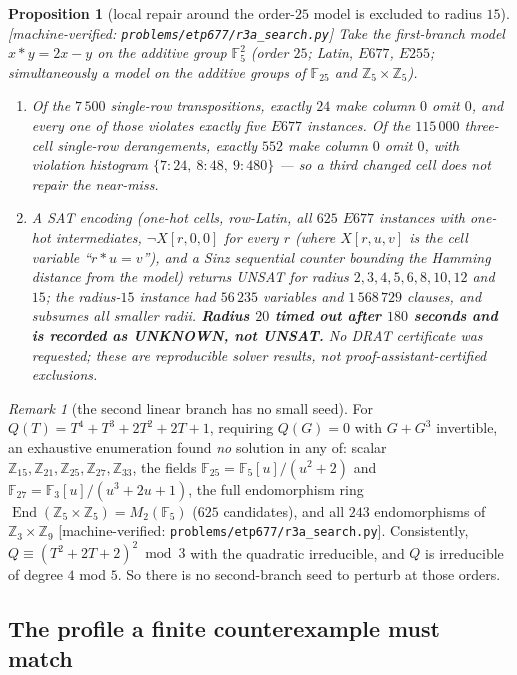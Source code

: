 \documentclass[11pt]{article}
\theoremstyle{plain}
\newtheorem{proposition}[theorem]{Proposition}
\theoremstyle{definition}
\theoremstyle{remark}
\newtheorem*{remark*}{Remark}
\numberwithin{equation}{section}
\newcommand{\Z}{\mathbb{Z}}
\newcommand{\F}{\mathbb{F}}
\newcommand{\op}{\mathbin{*}}
\newcommand{\End}{\operatorname{End}}
\newcommand{\statusbox}[1]{{\small\sloppy\textsf{[#1]}}}
\newcommand{\MV}[1]{\statusbox{machine-verified: \texttt{#1}}}
\begin{document}
\begin{proposition}[local repair around the order-$25$ model is excluded to radius $15$]\label{prop:radius}
\MV{problems\slash etp677\slash r3a\_search.py}
Take the first-branch model $x\op y = 2x-y$ on the additive group $\F_5^2$ (order $25$; Latin,
$E677$, $E255$; simultaneously a model on the additive groups of $\F_{25}$ and $\Z_5\times\Z_5$).
\begin{enumerate}
\item[(a)] Of the $7\,500$ single-row transpositions, exactly $24$ make column $0$ omit $0$,
and every one of those violates exactly five $E677$ instances. Of the $115\,000$ three-cell
single-row derangements, exactly $552$ make column $0$ omit $0$, with violation histogram
$\{7\!:\!24,\ 8\!:\!48,\ 9\!:\!480\}$ --- so a third changed cell does not repair the
near-miss.
\item[(b)] A SAT encoding (one-hot cells, row-Latin, all $625$ $E677$ instances with one-hot
intermediates, $\neg X[r,0,0]$ for every $r$ (where $X[r,u,v]$ is the cell variable ``$r\op u = v$''), and a Sinz sequential counter bounding the
Hamming distance from the model) returns UNSAT for radius $2,3,4,5,6,8,10,12$ and $15$; the
radius-$15$ instance had $56\,235$ variables and $1\,568\,729$ clauses, and subsumes all
smaller radii. \textbf{Radius $20$ timed out after $180$ seconds and is recorded as UNKNOWN,
not UNSAT.} No DRAT certificate was requested; these are reproducible solver results, not
proof-assistant-certified exclusions.
\end{enumerate}
\end{proposition}

\begin{remark*}[the second linear branch has no small seed]
For $Q(T) = T^4+T^3+2T^2+2T+1$, requiring $Q(G)=0$ with $G+G^3$ invertible, an exhaustive
enumeration found \emph{no} solution in any of: scalar $\Z_{15}, \Z_{21}, \Z_{25}, \Z_{27},
\Z_{33}$, the fields $\F_{25} = \F_5[u]/(u^2+2)$ and $\F_{27} = \F_3[u]/(u^3+2u+1)$, the full
endomorphism ring $\End(\Z_5\times\Z_5) = M_2(\F_5)$ ($625$ candidates), and all $243$
endomorphisms of $\Z_3\times\Z_9$ \MV{problems\slash etp677\slash r3a\_search.py}. Consistently,
$Q \equiv (T^2+2T+2)^2 \bmod 3$ with the quadratic irreducible, and $Q$ is irreducible of
degree $4$ mod $5$. So there is no second-branch seed to perturb at those orders.
\end{remark*}

\subsection{The profile a finite counterexample must match}\label{sec:profile}
\end{document}
